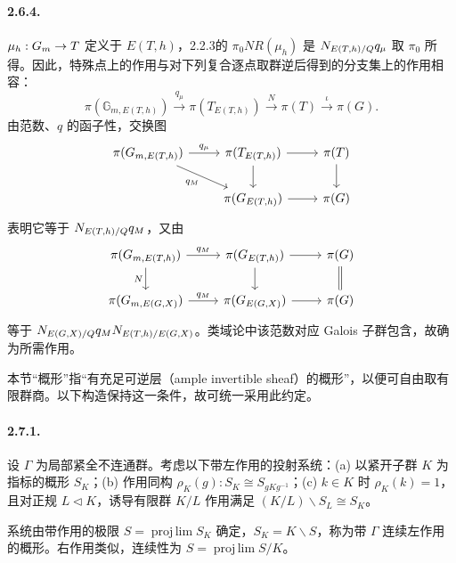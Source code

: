 \paragraph*{2.6.4.} $\mu_h:G_{m}\to T$ 定义于 $E(T,h)$，2.2.3的 $\pi_0NR(\mu_h)$ 是 $N_{E(T,h)/Q}q_\mu$ 取 $\pi_0$ 所得。因此，特殊点上的作用与对下列复合逐点取群逆后得到的分支集上的作用相容：
\[
 \pi(\mathbb G_{m,E(T,h)})\xrightarrow{q_\mu}\pi(T_{E(T,h)})
 \xrightarrow N\pi(T)\xrightarrow\iota\pi(G).
\]
由范数、$q$ 的函子性，交换图
\[
 \begin{tikzcd}
 \pi(\mathbb G_{m,E(T,h)})\arrow[r,"q_\mu"]\arrow[dr,"q_M"']&\pi(T_{E(T,h)})\arrow[r]\arrow[d]&\pi(T)\arrow[d]\\
 &\pi(G_{E(T,h)})\arrow[r]&\pi(G)
 \end{tikzcd}
\]
表明它等于 $N_{E(T,h)/Q}q_M$，又由
\[
 \begin{tikzcd}
 \pi(\mathbb G_{m,E(T,h)})\arrow[r,"q_M"]\arrow[d,"N"']&\pi(G_{E(T,h)})\arrow[r]\arrow[d]&\pi(G)\arrow[d,equal]\\
 \pi(\mathbb G_{m,E(G,X)})\arrow[r,"q_M"]&\pi(G_{E(G,X)})\arrow[r]&\pi(G)
 \end{tikzcd}
\]
等于 $N_{E(G,X)/Q}q_MN_{E(T,h)/E(G,X)}$。类域论中该范数对应 Galois 子群包含，故确为所需作用。

本节“概形”指“有充足可逆层（ample invertible sheaf）的概形”，以便可自由取有限群商。以下构造保持这一条件，故可统一采用此约定。
\paragraph*{2.7.1.} 设 $\Gamma$ 为局部紧全不连通群。考虑以下带左作用的投射系统：(a) 以紧开子群 $K$ 为指标的概形 $S_K$；(b) 作用同构 $\rho_K(g):S_K\cong S_{gKg^{-1}}$；(c) $k\in K$ 时 $\rho_K(k)=1$，且对正规 $L\triangleleft K$，诱导有限群 $K/L$ 作用满足 $(K/L)\backslash S_L\cong S_K$。

系统由带作用的极限 $S=\operatorname{proj\,lim}S_K$ 确定，$S_K=K\backslash S$，称为带 $\Gamma$ 连续左作用的概形。右作用类似，连续性为 $S=\operatorname{proj\,lim}S/K$。

